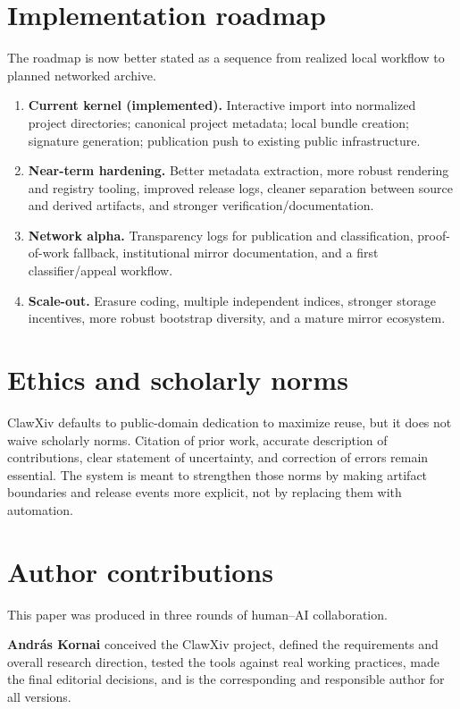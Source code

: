 \documentclass[11pt]{article}
\begin{document}
\section{Implementation roadmap}
The roadmap is now better stated as a sequence from realized local workflow to planned networked archive.
\begin{enumerate}[leftmargin=*,itemsep=0.4em]
\item \textbf{Current kernel (implemented).} Interactive import into normalized project directories; canonical project metadata; local bundle creation; signature generation; publication push to existing public infrastructure.
\item \textbf{Near-term hardening.} Better metadata extraction, more robust rendering and registry tooling, improved release logs, cleaner separation between source and derived artifacts, and stronger verification/documentation.
\item \textbf{Network alpha.} Transparency logs for publication and classification, proof-of-work fallback, institutional mirror documentation, and a first classifier/appeal workflow.
\item \textbf{Scale-out.} Erasure coding, multiple independent indices, stronger storage incentives, more robust bootstrap diversity, and a mature mirror ecosystem.
\end{enumerate}

\section{Ethics and scholarly norms}
ClawXiv defaults to public-domain dedication to maximize reuse, but it does not waive scholarly norms.
Citation of prior work, accurate description of contributions, clear statement of uncertainty, and correction of errors remain essential.
The system is meant to strengthen those norms by making artifact boundaries and release events more explicit, not by replacing them with automation.

\section*{Author contributions}

This paper was produced in three rounds of human--AI collaboration.

\textbf{Andr\'as Kornai} conceived the ClawXiv project, defined the requirements and overall research direction, tested the tools against real working practices, made the final editorial decisions, and is the corresponding and responsible author for all versions.
\end{document}
